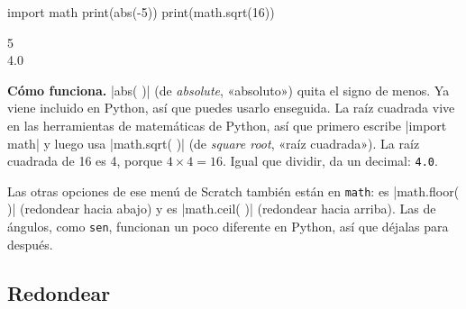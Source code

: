 \begin{tcbraster}[raster columns=1, raster valign=center, raster row skip=6pt]
\begin{tcolorbox}[colback=white, colframe=white, boxrule=0pt, valign=center]
\begin{scratch}
\end{scratch}
\end{tcolorbox}
\begin{tcolorbox}[colback=white, colframe=white, boxrule=0pt, left=0pt, right=0pt, top=0pt, bottom=0pt, valign=center]
\begin{code}
import math
print(abs(-5))
print(math.sqrt(16))
\end{code}
\begin{outputbox}
5\\
4.0
\end{outputbox}
\end{tcolorbox}
\end{tcbraster}

\textbf{Cómo funciona.} \py|abs( )| (de \emph{absolute}, «absoluto») quita el signo de menos. Ya viene incluido en Python, así que puedes usarlo enseguida. La raíz cuadrada vive en las herramientas de matemáticas de Python, así que primero escribe \py|import math| y luego usa \py|math.sqrt( )| (de \emph{square root}, «raíz cuadrada»). La raíz cuadrada de 16 es 4, porque $4 \times 4 = 16$. Igual que dividir, da un decimal: \texttt{4.0}.

Las otras opciones de ese menú de Scratch también están en \texttt{math}:  es \py|math.floor( )| (redondear hacia abajo) y  es \py|math.ceil( )| (redondear hacia arriba). Las de ángulos, como \texttt{sen}, funcionan un poco diferente en Python, así que déjalas para después.

\subsection*{Redondear}

